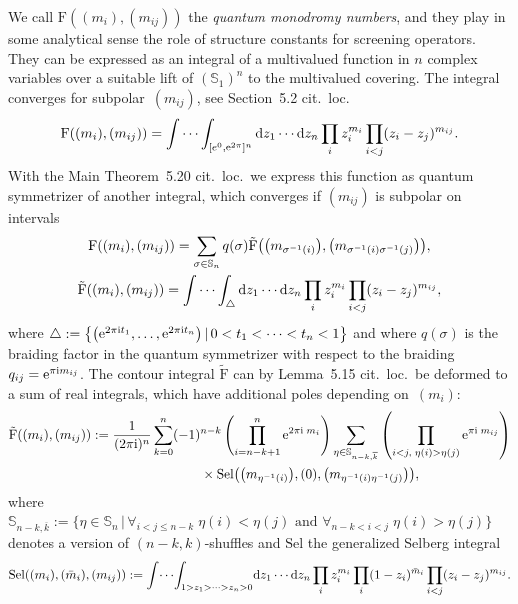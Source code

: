 \documentclass[pdftex]{sigma}%
\numberwithin{equation}{section}
\renewcommand{\S}{\mathbb{S}}
\renewcommand{\i}{\mathrm{i}}
\newcommand{\Sel}{\mathrm{Sel}}
\newcommand{\Fp}{\mathrm{F}}
\newcommand{\rFp}{\tilde{\mathrm{F}}}
\begin{document}
We call $\Fp((m_i),(m_{ij}))$ the \emph{quantum monodromy numbers}, and they play in some analytical sense the role of structure constants for screening operators. They can be expressed as an integral of a multivalued function in $n$ complex variables over a suitable lift of $(\mathbb{S}_1)^n$ to the multivalued covering. The integral converges for subpolar~$(m_{ij})$, see Section~5.2 cit.~loc.
\begin{gather*}
\Fp((m_i),(m_{ij})) =\int\cdots\int_{[e^0,{\rm e}^{2\pi}]^n} {\rm d} z_1\cdots {\rm d} z_n \prod_i z_i^{m_i}\prod_{i<j}(z_i - z_j)^{m_{ij}}.
\end{gather*}
	With the Main Theorem~5.20 cit.~loc.~we express this function as quantum symmetrizer of another integral, which converges if $(m_{ij})$ is subpolar on intervals
\begin{gather*}
\Fp((m_i),(m_{ij})) =\sum_{\sigma\in \S_n} q(\sigma) \rFp\big(\big(m_{\sigma^{-1}(i)}\big),\big(m_{\sigma^{-1}(i)\sigma^{-1}(j)}\big)\big),\\
\rFp((m_i),(m_{ij}))
 =\int\cdots\int_{\triangle} {\rm d} z_1\cdots {\rm d} z_n \prod_i z_i^{m_i}\prod_{i<j}(z_i - z_j)^{m_{ij}},
\end{gather*}
where $\triangle:=\big\{\big({\rm e}^{2\pi\i t_1},\dots,{\rm e}^{2\pi\i t_n}\big) \,|\, 0<t_1<\cdots <t_n<1\big\}$ and where $q(\sigma)$ is the braiding factor in the quantum symmetrizer with respect to the braiding $q_{ij}={\rm e}^{\pi\i m_{ij}}$. The contour integral $\rFp$ can by Lemma~5.15 cit.~loc.~be deformed to a sum of real integrals, which have additional poles depending on~$(m_i)$:
\begin{gather*}
\rFp((m_i),(m_{ij}))
 :=\frac{1}{(2\pi\i)^n}\sum_{k=0}^n (-1)^{n-k}\left(\prod_{i=n-k+1}^n {\rm e}^{2\pi\i\;m_i}\right)\sum_{\eta\in\S_{n-k,\overline{k}}}\left(\prod_{i<j,\;\eta(i)>\eta(j)}{\rm e}^{\pi\i\;m_{ij}}\right)\\
 \hphantom{\rFp((m_i),(m_{ij})):= }{}
 \times
\Sel\big(\big(m_{\eta^{-1}(i)}\big),(0),\big(m_{\eta^{-1}(i)\eta^{-1}(j)}\big)\big),
\end{gather*}
where $\mathbb{S}_{n-k,\overline{k}}:=\{\eta\in \mathbb{S}_n \,|\, \forall_{i<j\leq n-k}\;\eta(i)<\eta(j)\text{ and } \forall_{n-k<i<j}\;\eta(i)>\eta(j)\}$ denotes a version of $(n-k,k)$-shuffles and $\Sel$ the generalized Selberg integral
\begin{gather*}
\Sel((m_i),(\bar{m}_i),(m_{ij})):=\int\!\cdots\!\int_{1> z_1>\dots >z_{n}> 0}\! {\rm d}z_1\cdots {\rm d}z_{n}
\prod_i z_i^{m_i}\prod_i (1-z_i)^{\bar{m}_i}\prod_{i<j} (z_i-z_j)^{m_{ij}}.
\end{gather*}
\end{document}
